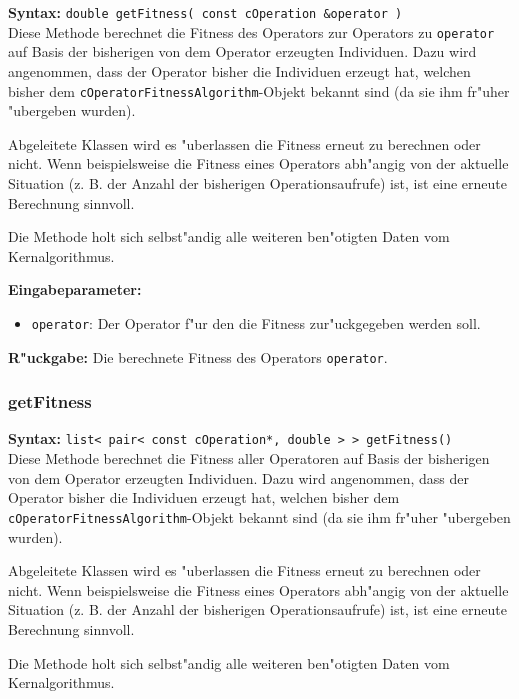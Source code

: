 \textbf{Syntax:} \verb|double getFitness( const cOperation &operator )| \\

Diese Methode berechnet die Fitness des Operators zur Operators zu \verb|operator| auf Basis der bisherigen von dem Operator erzeugten Individuen. Dazu wird angenommen, dass der Operator bisher die Individuen erzeugt hat, welchen bisher dem \verb|cOperatorFitnessAlgorithm|-Objekt bekannt sind (da sie ihm fr"uher "ubergeben wurden).

Abgeleitete Klassen wird es "uberlassen die Fitness erneut zu berechnen oder nicht. Wenn beispielsweise die Fitness eines Operators abh"angig von der aktuelle Situation (z. B. der Anzahl der bisherigen Operationsaufrufe) ist, ist eine erneute Berechnung sinnvoll.

Die Methode holt sich selbst"andig alle weiteren ben"otigten Daten vom Kernalgorithmus.

\bigskip\noindent
\textbf{Eingabeparameter:}
\begin{itemize}
 \item \verb|operator|: Der Operator f"ur den die Fitness zur"uckgegeben werden soll.
\end{itemize}

\bigskip\noindent
\textbf{R"uckgabe:} Die berechnete Fitness des Operators \verb|operator|.


\subsubsection{getFitness}

\textbf{Syntax:} \verb|list< pair< const cOperation*, double > > getFitness()| \\

Diese Methode berechnet die Fitness aller Operatoren auf Basis der bisherigen von dem Operator erzeugten Individuen. Dazu wird angenommen, dass der Operator bisher die Individuen erzeugt hat, welchen bisher dem \verb|cOperatorFitnessAlgorithm|-Objekt bekannt sind (da sie ihm fr"uher "ubergeben wurden).

Abgeleitete Klassen wird es "uberlassen die Fitness erneut zu berechnen oder nicht. Wenn beispielsweise die Fitness eines Operators abh"angig von der aktuelle Situation (z. B. der Anzahl der bisherigen Operationsaufrufe) ist, ist eine erneute Berechnung sinnvoll.

Die Methode holt sich selbst"andig alle weiteren ben"otigten Daten vom Kernalgorithmus.

